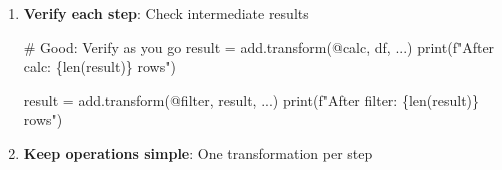 \documentclass[
  letterpaper,
]{scrbook}
\newenvironment{Shaded}{\begin{snugshade}}{\end{snugshade}}
\newcommand{\BuiltInTok}[1]{\textcolor[rgb]{0.00,0.23,0.31}{#1}}
\newcommand{\CommentTok}[1]{\textcolor[rgb]{0.37,0.37,0.37}{#1}}
\newcommand{\NormalTok}[1]{\textcolor[rgb]{0.00,0.23,0.31}{#1}}
\newcommand{\OperatorTok}[1]{\textcolor[rgb]{0.37,0.37,0.37}{#1}}
\newcommand{\SpecialCharTok}[1]{\textcolor[rgb]{0.37,0.37,0.37}{#1}}
\newcommand{\SpecialStringTok}[1]{\textcolor[rgb]{0.13,0.47,0.30}{#1}}
\newcommand{\StringTok}[1]{\textcolor[rgb]{0.13,0.47,0.30}{#1}}
\begin{document}
\begin{enumerate}
\begin{Shaded}
\begin{Highlighting}[]
\CommentTok{\# Good: Clear steps}
\NormalTok{with\_sales }\OperatorTok{=}\NormalTok{ add.transform(}\StringTok{\textquotesingle{}@calc\textquotesingle{}}\NormalTok{, df, ...)}
\NormalTok{filtered }\OperatorTok{=}\NormalTok{ add.transform(}\StringTok{\textquotesingle{}@filter\textquotesingle{}}\NormalTok{, with\_sales, ...)}
\NormalTok{aggregated }\OperatorTok{=}\NormalTok{ add.transform(}\StringTok{\textquotesingle{}@aggregate\textquotesingle{}}\NormalTok{, filtered, ...)}
\NormalTok{final }\OperatorTok{=}\NormalTok{ add.transform(}\StringTok{\textquotesingle{}@sort\textquotesingle{}}\NormalTok{, aggregated, ...)}

\CommentTok{\# Less clear: Chained without names}
\NormalTok{result }\OperatorTok{=}\NormalTok{ add.transform(}\StringTok{\textquotesingle{}@sort\textquotesingle{}}\NormalTok{, }
\NormalTok{             add.transform(}\StringTok{\textquotesingle{}@aggregate\textquotesingle{}}\NormalTok{,}
\NormalTok{                 add.transform(}\StringTok{\textquotesingle{}@filter\textquotesingle{}}\NormalTok{,}
\NormalTok{                     add.transform(}\StringTok{\textquotesingle{}@calc\textquotesingle{}}\NormalTok{, df, ...), ...), ...), ...)}
\end{Highlighting}
\end{Shaded}
\item
  \textbf{Verify each step}: Check intermediate results

\begin{Shaded}
\begin{Highlighting}[]
\CommentTok{\# Good: Verify as you go}
\NormalTok{result }\OperatorTok{=}\NormalTok{ add.transform(}\StringTok{\textquotesingle{}@calc\textquotesingle{}}\NormalTok{, df, ...)}
\BuiltInTok{print}\NormalTok{(}\SpecialStringTok{f"After calc: }\SpecialCharTok{\{}\BuiltInTok{len}\NormalTok{(result)}\SpecialCharTok{\}}\SpecialStringTok{ rows"}\NormalTok{)}

\NormalTok{result }\OperatorTok{=}\NormalTok{ add.transform(}\StringTok{\textquotesingle{}@filter\textquotesingle{}}\NormalTok{, result, ...)}
\BuiltInTok{print}\NormalTok{(}\SpecialStringTok{f"After filter: }\SpecialCharTok{\{}\BuiltInTok{len}\NormalTok{(result)}\SpecialCharTok{\}}\SpecialStringTok{ rows"}\NormalTok{)}
\end{Highlighting}
\end{Shaded}
\item
  \textbf{Keep operations simple}: One transformation per step


\end{enumerate}
\end{document}
